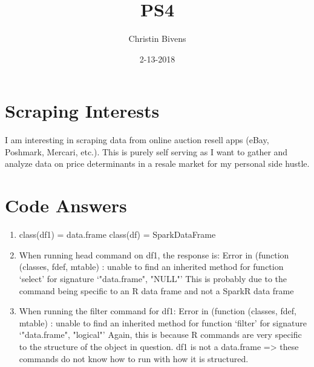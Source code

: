 \documentclass{article}
\title{PS4}
\author{Christin Bivens}
\date{2-13-2018}
\begin{document}
\maketitle

\section{Scraping Interests}
    I am interesting in scraping data from online auction resell apps (eBay, Poshmark, Mercari, etc.). This is purely self serving as I want to gather and analyze data on price determinants in a resale market for my personal side hustle.
    
\section{Code Answers}
\begin{enumerate}
\item class(df1) = data.frame
      class(df) = SparkDataFrame
\item When running head command on df1, the response is:
Error in (function (classes, fdef, mtable)  : 
  unable to find an inherited method for function ‘select’ for signature ‘"data.frame", "NULL"’
  This is probably due to the command being specific to an R data frame and not a SparkR data frame
\item When running the filter command for df1:
Error in (function (classes, fdef, mtable)  : 
  unable to find an inherited method for function ‘filter’ for signature ‘"data.frame", "logical"’
  Again, this is because R commands are very specific to the structure of the object in question. df1 is not a data.frame => these commands do not know how to run with how it is structured.
\end{enumerate}
\end{document}

